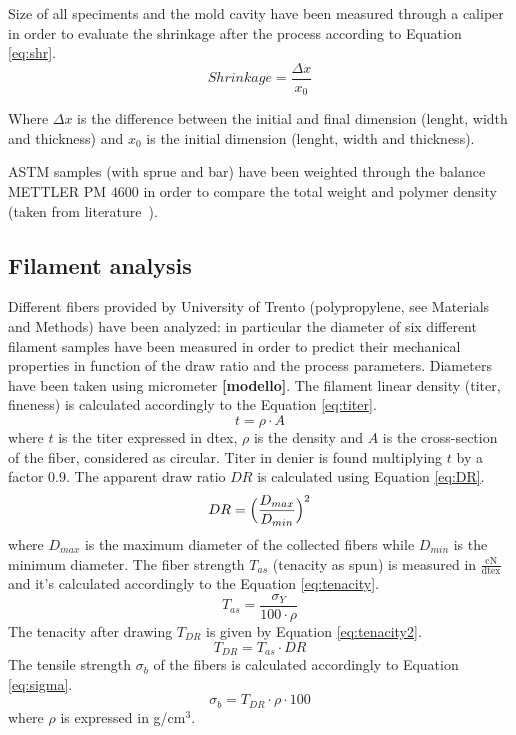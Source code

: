 \documentclass[a4paper, 11pt]{article}
\begin{document}
Size of all speciments and the mold cavity have been measured through a caliper in order to evaluate the shrinkage after the process according to Equation \ref{eq:shr}.
\begin{equation}
Shrinkage = \frac{\Delta x}{x_0}
\label{eq:shr}
\end{equation}

Where $\Delta x$ is the difference between the initial and final dimension (lenght, width and thickness) and $x_0$ is the initial dimension (lenght, width and thickness). 

ASTM samples (with sprue and bar) have been weighted through the balance METTLER PM ${4600}$ in order to compare the total weight and polymer density (taken from literature~\cite{handbook}).

\subsection{Filament analysis}

Different fibers provided by University of Trento (polypropylene, see Materials and Methods) have been analyzed: in particular the diameter of six different filament samples have been measured in order to predict their mechanical properties in function of the draw ratio and the process parameters. 
Diameters have been taken using micrometer \textbf{[modello]}. The filament linear density (titer, fineness) is calculated accordingly to the Equation \ref{eq:titer}. 
\begin{equation}
	t = \rho \cdot A
	\label{eq:titer}
\end{equation}
where $t$ is the titer expressed in dtex, $\rho$ is the density and $A$ is the cross-section of the fiber, considered as circular. Titer in denier is found multiplying $t$ by a factor 0.9. The apparent draw ratio $DR$ is calculated using Equation \ref{eq:DR}. 
\begin{equation}
	DR = \Bigl(\frac{D_{max}}{D_{min}}\Bigr)^2
	\label{eq:DR}
\end{equation}
where $D_{max}$ is the maximum diameter of the collected fibers while $D_{min}$ is the minimum diameter. The fiber strength $T_{as}$ (tenacity as spun) is measured in $\frac{\text{cN}}{\text{dtex}}$ and it's calculated accordingly to the Equation \ref{eq:tenacity}. 
\begin{equation}
	T_{as} = \frac{\sigma_Y}{100\cdot \rho}
	\label{eq:tenacity}
\end{equation}
The tenacity after drawing $T_{DR}$ is given by Equation \ref{eq:tenacity2}. 
\begin{equation}
	T_{DR} = T_{as}\cdot DR
	\label{eq:tenacity2}
\end{equation}
The tensile strength $\sigma_b$ of the fibers is calculated accordingly to Equation \ref{eq:sigma}.
\begin{equation}
	\sigma_{b} = T_{DR}\cdot \rho \cdot 100
	\label{eq:sigma}
\end{equation}
where $\rho$ is expressed in g/cm$^3$. 
\end{document}
